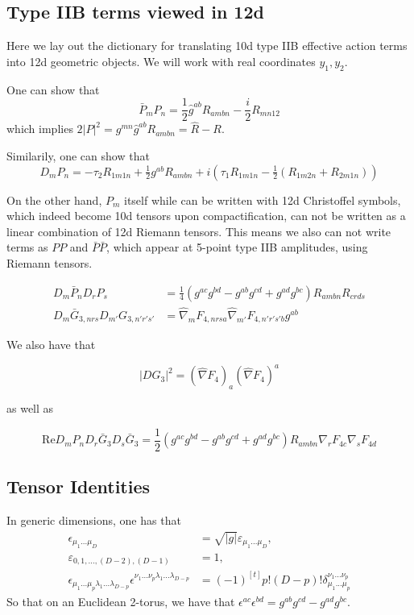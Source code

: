 \subsection{Type IIB terms viewed in 12d}
Here we lay out the dictionary for translating 10d type IIB effective action terms into 12d geometric objects. We will work with real coordinates $y_1, y_2$.

One can show that
\begin{equation}
\bar{P}_m P_n = \frac{1}{2} \hat{g}^{ab} R_{ambn} - \frac{i}{2} R_{mn12}
\end{equation}
which implies $2|P|^2 = g^{mn}\hat{g}^{ab} R_{ambn} = \hat{R} - R$.

Similarily, one can show that
\begin{equation}
D_m P_n = -\tau_2 R_{1m1n} + \tfrac{1}{2} g^{ab} R_{ambn} + i \left( \tau_1  R_{1m1n} - \tfrac{1}{2}(R_{1m2n} + R_{2m1n}) \right)
\end{equation}

On the other hand, $P_m$ itself while can be written with 12d Christoffel symbols, which indeed become 10d tensors upon compactification, can not be written as a linear combination of 12d Riemann tensors.
This means we also can not write terms as $PP$ and $\bar{P}\bar{P}$, which appear at 5-point type IIB amplitudes, using Riemann tensors.

\begin{equation}
\begin{aligned}
D_m\bar{P}_n D_r P_s &= \frac{1}{4}(g^{ac}g^{bd} - g^{ab}g^{cd}+g^{ad}g^{bc})R_{ambn}R_{crds}\\
D_m \bar{G}_{3,nrs} D_{m'} G_{3,n'r's'}
&= \hat{\nabla}_m F_{4,nrs a} \hat{\nabla}_{m'} F_{4,n'r's' b} g^{ab}\end{aligned}
\end{equation}

We also have that 

$$|DG_3|^2 = (\hat{\nabla} F_4)_a (\hat{\nabla} F_4)^a$$

as well as

\begin{equation}
\text{Re} D_m P_n D_r \bar{G}_3 D_s \bar{G}_3 = \frac{1}{2} (g^{ac} g^{bd} - g^{ab}g^{cd} + g^{ad}g^{bc}) R_{ambn} \nabla_r F_{4c} \nabla_s F_{4d}
\end{equation}


\subsection{Tensor Identities}
In generic dimensions, one has that
\begin{equation}
\begin{aligned}
\epsilon_{\mu_1...\mu_D} 
&= \sqrt{|g|}\varepsilon_{\mu_1...\mu_D},\\
\varepsilon_{0,1,...,(D-2),(D-1)} 
&= 1,\\
\epsilon_{\mu_1...\mu_p \lambda_1 ...\lambda_{D-p}}
\epsilon^{\nu_1...\nu_p \lambda_1 ...\lambda_{D-p}}
&=(-1)^{[t]} p!(D-p)!\delta^{\nu_1...\nu_p}_{\mu_1...\mu_p}
\end{aligned}
\end{equation}
So that on an Euclidean 2-torus, we have that $\epsilon^{ac}\epsilon^{bd} = g^{ab}g^{cd} - g^{ad}g^{bc}$.

